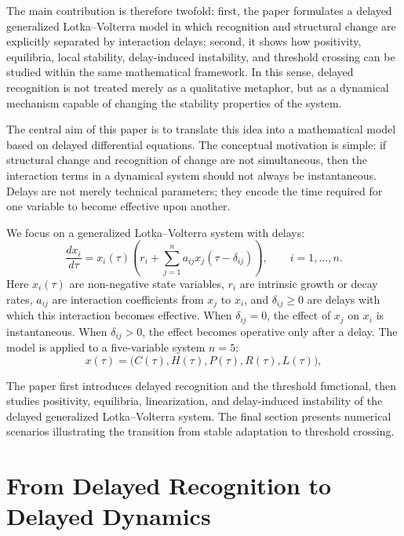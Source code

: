 \documentclass[11pt]{article}
\def\beq{\begin{equation}}
\def\eeq{\end{equation}}
\begin{document}
The main contribution is therefore twofold: first, the paper formulates a delayed generalized Lotka--Volterra model in which recognition and structural change are explicitly separated by interaction delays; second, it shows how positivity, equilibria, local stability, delay-induced instability, and threshold crossing can be studied within the same mathematical framework. In this sense, delayed recognition is not treated merely as a qualitative metaphor, but as a dynamical mechanism capable of changing the stability properties of the system.

The central aim of this paper is to translate this idea into a mathematical model based on delayed differential equations. The conceptual motivation is simple: if structural change and recognition of change are not simultaneous, then the interaction terms in a dynamical system should not always be instantaneous. Delays are not merely technical parameters; they encode the time required for one variable to become effective upon another.

We focus on a generalized Lotka--Volterra system with delays:
\beq\label{eq:general-delayed-lv}
\frac{dx_i}{d\tau}
=
x_i(\tau)
\left(
r_i+\sum_{j=1}^{n}a_{ij}x_j(\tau-\delta_{ij})
\right),
\qquad i=1,\ldots,n.
\eeq
Here $x_i(\tau)$ are non-negative state variables, $r_i$ are intrinsic growth or decay rates, $a_{ij}$ are interaction coefficients from $x_j$ to $x_i$, and $\delta_{ij}\geq 0$ are delays with which this interaction becomes effective. When $\delta_{ij}=0$, the effect of $x_j$ on $x_i$ is instantaneous. When $\delta_{ij}>0$, the effect becomes operative only after a delay.
The model is applied to a five-variable system $n=5$:
\beq \label{eq:five-variable-vector}
x(\tau)=
\big(C(\tau),H(\tau),P(\tau),R(\tau),L(\tau)\big),
\eeq



The paper first introduces delayed recognition and the threshold functional, then studies positivity, equilibria, linearization, and delay-induced instability of the delayed generalized Lotka--Volterra system. The final section presents numerical scenarios illustrating the transition from stable adaptation to threshold crossing.




\section{From Delayed Recognition to Delayed Dynamics}
\label{sec:delayed-recognition}
\end{document}
